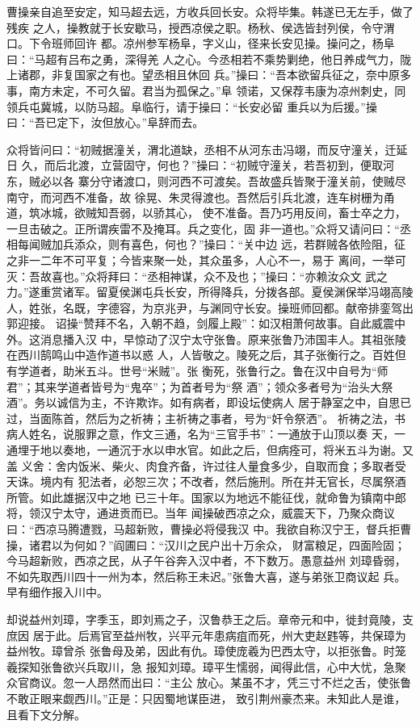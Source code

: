 曹操亲自追至安定，知马超去远，方收兵回长安。众将毕集。韩遂已无左手，做了残疾
之人，操教就于长安歇马，授西凉侯之职。杨秋、侯选皆封列侯，令守渭口。下令班师回许
都。凉州参军杨阜，字义山，径来长安见操。操问之，杨阜曰：“马超有吕布之勇，深得羌
人之心。今丞相若不乘势剿绝，他日养成气力，陇上诸郡，非复国家之有也。望丞相且休回
兵。”操曰：“吾本欲留兵征之，奈中原多事，南方未定，不可久留。君当为孤保之。”阜
领诺，又保荐韦康为凉州刺史，同领兵屯冀城，以防马超。阜临行，请于操曰：“长安必留
重兵以为后援。”操曰：“吾已定下，汝但放心。”阜辞而去。

众将皆问曰：“初贼据潼关，渭北道缺，丞相不从河东击冯翊，而反守潼关，迁延日
久，而后北渡，立营固守，何也？”操曰：“初贼守潼关，若吾初到，便取河东，贼必以各
寨分守诸渡口，则河西不可渡矣。吾故盛兵皆聚于潼关前，使贼尽南守，而河西不准备，故
徐晃、朱灵得渡也。吾然后引兵北渡，连车树栅为甬道，筑冰城，欲贼知吾弱，以骄其心，
使不准备。吾乃巧用反间，畜士卒之力，一旦击破之。正所谓疾雷不及掩耳。兵之变化，固
非一道也。”众将又请问曰：“丞相每闻贼加兵添众，则有喜色，何也？”操曰：“关中边
远，若群贼各依险阻，征之非一二年不可平复；今皆来聚一处，其众虽多，人心不一，易于
离间，一举可灭：吾故喜也。”众将拜曰：“丞相神谋，众不及也；”操曰：“亦赖汝众文
武之力。”遂重赏诸军。留夏侯渊屯兵长安，所得降兵，分拨各部。夏侯渊保举冯翊高陵
人，姓张，名既，字德容，为京兆尹，与渊同守长安。操班师回都。献帝排銮驾出郭迎接。
诏操“赞拜不名，入朝不趋，剑履上殿”：如汉相萧何故事。自此威震中外。这消息播入汉
中，早惊动了汉宁太守张鲁。原来张鲁乃沛国丰人。其祖张陵在西川鹄鸣山中造作道书以惑
人，人皆敬之。陵死之后，其子张衡行之。百姓但有学道者，助米五斗。世号“米贼”。张
衡死，张鲁行之。鲁在汉中自号为“师君”；其来学道者皆号为“鬼卒”；为首者号为“祭
酒”；领众多者号为“治头大祭酒”。务以诚信为主，不许欺诈。如有病者，即设坛使病人
居于静室之中，自思已过，当面陈首，然后为之祈祷；主祈祷之事者，号为“奸令祭洒”。
祈祷之法，书病人姓名，说服罪之意，作文三通，名为“三官手书”：一通放于山顶以奏
天，一通埋于地以奏地，一通沉于水以申水官。如此之后，但病痊可，将米五斗为谢。又盖
义舍：舍内饭米、柴火、肉食齐备，许过往人量食多少，自取而食；多取者受天诛。境内有
犯法者，必恕三次；不改者，然后施刑。所在并无官长，尽属祭酒所管。如此雄据汉中之地
已三十年。国家以为地远不能征伐，就命鲁为镇南中郎将，领汉宁太守，通进贡而已。当年
闻操破西凉之众，威震天下，乃聚众商议曰：“西凉马腾遭戮，马超新败，曹操必将侵我汉
中。我欲自称汉宁王，督兵拒曹操，诸君以为何如？”阎圃曰：“汉川之民户出十万余众，
财富粮足，四面险固；今马超新败，西凉之民，从子午谷奔入汉中者，不下数万。愚意益州
刘璋昏弱，不如先取西川四十一州为本，然后称王未迟。”张鲁大喜，遂与弟张卫商议起
兵。早有细作报入川中。

却说益州刘璋，字季玉，即刘焉之子，汉鲁恭王之后。章帝元和中，徙封竟陵，支庶因
居于此。后焉官至益州牧，兴平元年患病疽而死，州大吏赵韪等，共保璋为益州牧。璋曾杀
张鲁母及弟，因此有仇。璋使庞羲为巴西太守，以拒张鲁。时笼羲探知张鲁欲兴兵取川，急
报知刘璋。璋平生懦弱，闻得此信，心中大忧，急聚众官商议。忽一人昂然而出曰：“主公
放心。某虽不才，凭三寸不烂之舌，使张鲁不敢正眼来觑西川。”正是：只因蜀地谋臣进，
致引荆州豪杰来。未知此人是谁，且看下文分解。